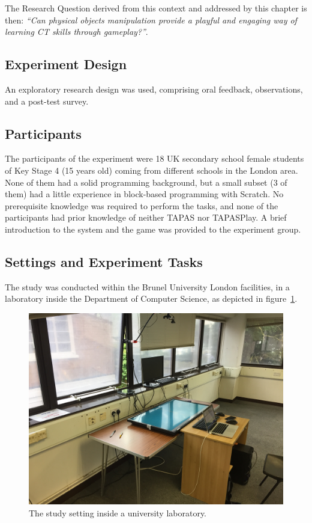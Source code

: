 The Research Question derived from this context and addressed by this chapter is then: \textit{``Can physical objects manipulation provide a playful and engaging way of learning \ac{CT} skills through gameplay?''}.

\subsection{Experiment Design}
An exploratory research design was used, comprising oral feedback, observations, and a post-test survey.

\subsection{Participants}
The participants of the experiment were 18 UK secondary school female students of Key Stage 4 (15 years old) coming from different schools in the London area. None of them had a solid programming background, but a small subset (3 of them) had a little experience in block-based programming with Scratch. No prerequisite knowledge was required to perform the tasks, and none of the participants had prior knowledge of neither \ac{TAPAS} nor TAPASPlay. A brief introduction to the system and the game was provided to the experiment group.

\subsection{Settings and Experiment Tasks}
The study was conducted within the Brunel University London facilities, in a laboratory inside the Department of Computer Science, as depicted in figure~\ref{fig:studysetting}.

\begin{figure}
  \centering
  \includegraphics[width=.7\textwidth]{images/c5/study-setting.jpg}
  \caption{The study setting inside a university laboratory.}
  \label{fig:studysetting}
\end{figure}

